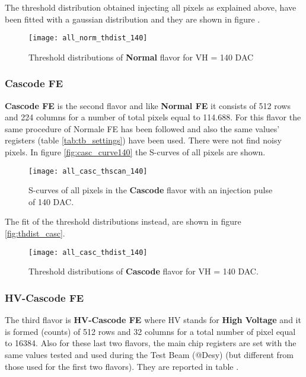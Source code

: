 The threshold distribution obtained injecting all pixels as explained above, have been fitted with a gaussian distribution and they are shown in figure \pageref{fig:thdist_norm}.

\begin{figure}[h!]
\centering
\texttt{[image: all\_norm\_thdist\_140]}
\caption{Threshold distributions of \textbf{Normal} flavor for VH = 140 DAC}
\label{fig:thdist_norm}
\end{figure}


\subsubsection{Cascode FE}

\textbf{Cascode FE} is the second flavor and like \textbf{Normal FE} it consists of 512 rows and 224 columns for a number of total pixels equal to 114.688. For this flavor the same procedure of Normale FE has been followed and also the same values' registers (table \vref{tab:tb_settings}) have been used. There were not find noisy pixels. 
In figure \vref{fig:casc_curve140} the S-curves of all pixels are shown.

\begin{figure}[h!]
\centering
\texttt{[image: all\_casc\_thscan\_140]}
\caption{S-curves of all pixels in the \textbf{Cascode} flavor with an injection pulse of 140 DAC.}
\label{fig:casc_scurve140}
\end{figure}

The fit of the threshold distributions instead, are shown in figure \vref{fig:thdist_casc}.

\begin{figure}[h!]
\centering
\texttt{[image: all\_casc\_thdist\_140]}
\caption{Threshold distributions of \textbf{Cascode} flavor for VH = 140 DAC.}
\label{fig:thdist_casc}
\end{figure}


\subsubsection{HV-Cascode FE}

The third flavor is \textbf{HV-Cascode FE} where HV stands for \textbf{High Voltage} and it is formed (counts) of 512 rows and 32 columns for a total number of pixel equal to 16384. Also for these last two flavors, the main chip registers are set with the same values tested and used during the Test Beam (@Desy) (but different from those used for the first two flavors). They are reported in table  .


